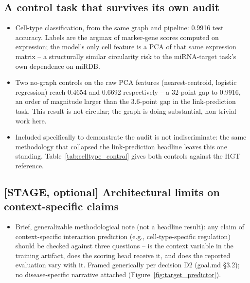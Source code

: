 \documentclass{bmcart}
\begin{document}
\subsection*{A control task that survives its own audit}
\begin{itemize}
\item Cell-type classification, from the same graph and pipeline: 0.9916 test accuracy.
Labels are the argmax of marker-gene scores computed on expression; the model's only
cell feature is a PCA of that same expression matrix -- a structurally similar
circularity risk to the miRNA-target task's own dependence on miRDB.
\item Two no-graph controls on the raw PCA features (nearest-centroid, logistic
regression) reach 0.4654 and 0.6692 respectively -- a 32-point gap to 0.9916, an order
of magnitude larger than the 3.6-point gap in the link-prediction task. This result is
not circular; the graph is doing substantial, non-trivial work here.
\item Included specifically to demonstrate the audit is not indiscriminate: the same
methodology that collapsed the link-prediction headline leaves this one standing.
Table~\ref{tab:celltype_control} gives both controls against the HGT reference.
\end{itemize}



\subsection*{[STAGE, optional] Architectural limits on context-specific claims}
\begin{itemize}
\item Brief, generalizable methodological note (not a headline result): any claim of
context-specific interaction prediction (e.g., cell-type-specific regulation) should be
checked against three questions -- is the context variable in the training artifact, does
the scoring head receive it, and does the reported evaluation vary with it. Framed
generically per decision D2 (goal.md \S3.2); no disease-specific narrative attached
(Figure~\ref{fig:target_predictor}).
\end{itemize}
\end{document}
